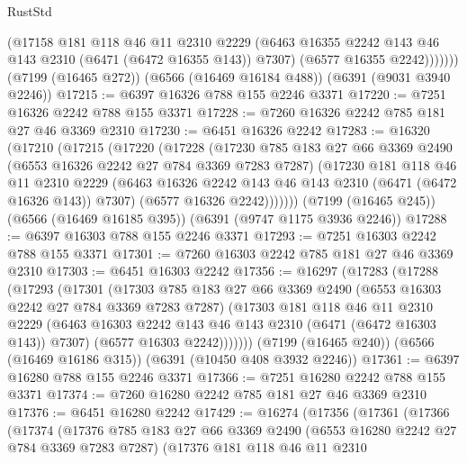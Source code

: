 \begin{lexlean}{RustStd}
\begin{coremodule}
              (@17158
                @181
                @118
                @46
                @11
                @2310
                @2229
                (@6463 @16355 @2242 @143 @46 @143 @2310 (@6471 (@6472 @16355 @143)) @7307)
                (@6577 @16355 @2242)))))))
    (@7199 (@16465 @272))
    (@6566 (@16469 @16184 @488))
    (@6391 (@9031 @3940 @2246))
@17215 := @6397 @16326 @788 @155 @2246 @3371
@17220 := @7251 @16326 @2242 @788 @155 @3371
@17228 := @7260 @16326 @2242 @785 @181 @27 @46 @3369 @2310
@17230 := @6451 @16326 @2242
@17283 := @16320
    (@17210
      (@17215
        (@17220
          (@17228
            (@17230
              @785
              @183
              @27
              @66
              @3369
              @2490
              (@6553 @16326 @2242 @27 @784 @3369 @7283 @7287)
              (@17230
                @181
                @118
                @46
                @11
                @2310
                @2229
                (@6463 @16326 @2242 @143 @46 @143 @2310 (@6471 (@6472 @16326 @143)) @7307)
                (@6577 @16326 @2242)))))))
    (@7199 (@16465 @245))
    (@6566 (@16469 @16185 @395))
    (@6391 (@9747 @1175 @3936 @2246))
@17288 := @6397 @16303 @788 @155 @2246 @3371
@17293 := @7251 @16303 @2242 @788 @155 @3371
@17301 := @7260 @16303 @2242 @785 @181 @27 @46 @3369 @2310
@17303 := @6451 @16303 @2242
@17356 := @16297
    (@17283
      (@17288
        (@17293
          (@17301
            (@17303
              @785
              @183
              @27
              @66
              @3369
              @2490
              (@6553 @16303 @2242 @27 @784 @3369 @7283 @7287)
              (@17303
                @181
                @118
                @46
                @11
                @2310
                @2229
                (@6463 @16303 @2242 @143 @46 @143 @2310 (@6471 (@6472 @16303 @143)) @7307)
                (@6577 @16303 @2242)))))))
    (@7199 (@16465 @240))
    (@6566 (@16469 @16186 @315))
    (@6391 (@10450 @408 @3932 @2246))
@17361 := @6397 @16280 @788 @155 @2246 @3371
@17366 := @7251 @16280 @2242 @788 @155 @3371
@17374 := @7260 @16280 @2242 @785 @181 @27 @46 @3369 @2310
@17376 := @6451 @16280 @2242
@17429 := @16274
    (@17356
      (@17361
        (@17366
          (@17374
            (@17376
              @785
              @183
              @27
              @66
              @3369
              @2490
              (@6553 @16280 @2242 @27 @784 @3369 @7283 @7287)
              (@17376
                @181
                @118
                @46
                @11
                @2310

\end{coremodule}
\end{lexlean}
